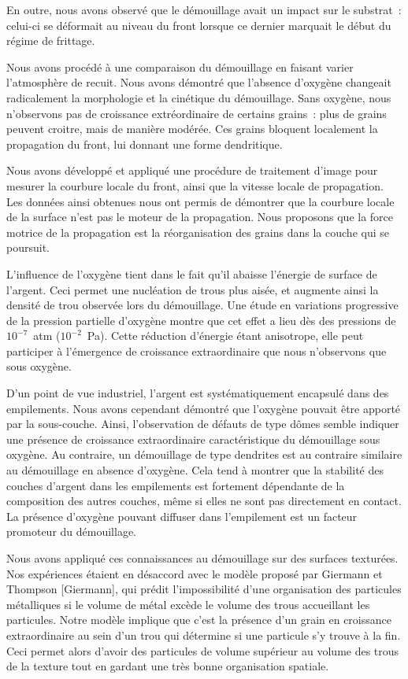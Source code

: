 En outre, nous avons observé que le démouillage avait un impact sur le substrat~: celui-ci se déformait au niveau du front lorsque ce dernier marquait le début du régime de frittage.\par 
Nous avons procédé à une comparaison du démouillage en faisant varier l'atmosphère de recuit. Nous avons démontré que l'absence d'oxygène changeait radicalement la morphologie et la cinétique du démouillage. Sans oxygène, nous n'observons pas de croissance extréordinaire de certains grains~: plus de grains peuvent croitre, mais de manière modérée. Ces grains bloquent localement la propagation du front, lui donnant une forme dendritique.\par 
Nous avons développé et appliqué une procédure de traitement d'image pour mesurer la courbure locale du front, ainsi que la vitesse locale de propagation. Les données ainsi obtenues nous ont permis de démontrer que la courbure locale de la surface n'est pas le moteur de la propagation. Nous proposons que la force motrice de la propagation est la réorganisation des grains dans la couche qui se poursuit. \par 
L'influence de l'oxygène tient dans le fait qu'il abaisse l'énergie de surface de l'argent. Ceci permet une nucléation de trous plus aisée, et augmente ainsi la densité de trou observée lors du démouillage. Une étude en variations progressive de la pression partielle d'oxygène montre que cet effet a lieu dès des pressions de $10^{-7}$~atm ($10^{-2}$~Pa). Cette réduction d'énergie étant anisotrope, elle peut participer à l'émergence de croissance extraordinaire que nous n'observons que sous oxygène.\par 
D'un point de vue industriel, l'argent est systématiquement encapsulé dans des empilements. Nous avons cependant démontré que l'oxygène pouvait être apporté par la sous-couche. Ainsi, l'observation de défauts de type \og dômes \fg{} semble indiquer une présence de croissance extraordinaire caractéristique du démouillage sous oxygène. Au contraire, un démouillage de type \og dendrites \fg{} est au contraire similaire au démouillage en absence d'oxygène. Cela tend à montrer que la stabilité des couches d'argent dans les empilements est fortement dépendante de la composition des autres couches, même si elles ne sont pas directement en contact. La présence d'oxygène pouvant diffuser dans l'empilement est un facteur promoteur du démouillage.\par 
Nous avons appliqué ces connaissances au démouillage sur des surfaces texturées. Nos expériences étaient en désaccord avec le modèle proposé par Giermann et Thompson [Giermann], qui prédit l'impossibilité d'une organisation des particules métalliques si le volume de métal excède le volume des trous accueillant les particules. Notre modèle implique que c'est la présence d'un grain en croissance extraordinaire au sein d'un trou qui détermine si une particule s'y trouve à la fin. Ceci permet alors d'avoir des particules de volume supérieur au volume des trous de la texture tout en gardant une très bonne organisation spatiale.\par 
